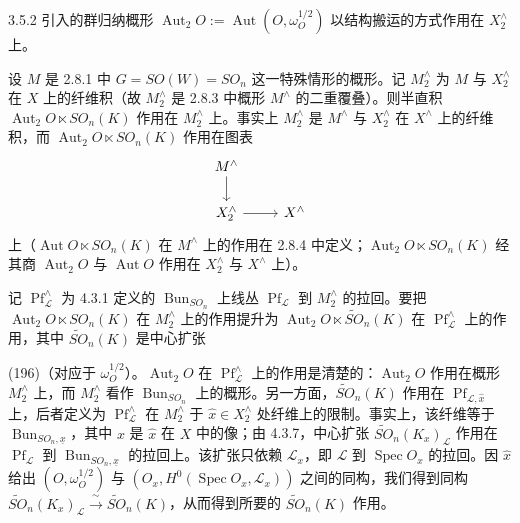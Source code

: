 3.5.2 引入的群归纳概形 $\operatorname{Aut}_{2}O:=\operatorname{Aut}(O,\omega_{O}^{1/2})$ 以结构搬运的方式作用在 $X_{2}^{\wedge}$ 上。

设 $M$ 是 2.8.1 中 $G=SO(W)=SO_{n}$ 这一特殊情形的概形。记 $M_{2}^{\wedge}$ 为 $M$ 与 $X_{2}^{\wedge}$ 在 $X$ 上的纤维积（故 $M_{2}^{\wedge}$ 是 2.8.3 中概形 $M^{\wedge}$ 的二重覆叠）。则半直积 $\operatorname{Aut}_{2}O\ltimes SO_{n}(K)$ 作用在 $M_{2}^{\wedge}$ 上。事实上 $M_{2}^{\wedge}$ 是 $M^{\wedge}$ 与 $X_{2}^{\wedge}$ 在 $X^{\wedge}$ 上的纤维积，而 $\operatorname{Aut}_{2}O\ltimes SO_{n}(K)$ 作用在图表
\[
\begin{tikzcd}
M^{\wedge} \arrow[d]\\
X_{2}^{\wedge} \arrow[r] & X^{\wedge}
\end{tikzcd}
\]
上（$\operatorname{Aut}O\ltimes SO_{n}(K)$ 在 $M^{\wedge}$ 上的作用在 2.8.4 中定义；$\operatorname{Aut}_{2}O\ltimes SO_{n}(K)$ 经其商 $\operatorname{Aut}_{2}O$ 与 $\operatorname{Aut}O$ 作用在 $X_{2}^{\wedge}$ 与 $X^{\wedge}$ 上）。

记 $\operatorname{Pf}_{\mathcal{L}}^{\wedge}$ 为 4.3.1 定义的 $\operatorname{Bun}_{SO_{n}}$ 上线丛 $\operatorname{Pf}_{\mathcal{L}}$ 到 $M_{2}^{\wedge}$ 的拉回。要把 $\operatorname{Aut}_{2}O\ltimes SO_{n}(K)$ 在 $M_{2}^{\wedge}$ 上的作用提升为 $\operatorname{Aut}_{2}O\ltimes\tilde{SO}_{n}(K)$ 在 $\operatorname{Pf}_{\mathcal{L}}^{\wedge}$ 上的作用，其中 $\tilde{SO}_{n}(K)$ 是中心扩张


(196)（对应于 $\omega_{O}^{1/2}$）。$\operatorname{Aut}_{2}O$ 在 $\operatorname{Pf}_{\mathcal{L}}^{\wedge}$ 上的作用是清楚的：$\operatorname{Aut}_{2}O$ 作用在概形 $M_{2}^{\wedge}$ 上，而 $M_{2}^{\wedge}$ 看作 $\operatorname{Bun}_{SO_{n}}$ 上的概形。另一方面，$\tilde{SO}_{n}(K)$ 作用在 $\operatorname{Pf}_{\mathcal{L},\hat x}$ 上，后者定义为 $\operatorname{Pf}_{\mathcal{L}}^{\wedge}$ 在 $M_{2}^{\wedge}$ 于 $\hat x\in X_{2}^{\wedge}$ 处纤维上的限制。事实上，该纤维等于 $\operatorname{Bun}_{SO_{n},\underline{x}}$，其中 $x$ 是 $\hat x$ 在 $X$ 中的像；由 4.3.7，中心扩张 $\tilde{SO}_{n}(K_{x})_{\mathcal{L}}$ 作用在 $\operatorname{Pf}_{\mathcal{L}}$ 到 $\operatorname{Bun}_{SO_{n},\underline{x}}$ 的拉回上。该扩张只依赖 $\mathcal{L}_{x}$，即 $\mathcal{L}$ 到 $\operatorname{Spec}O_{x}$ 的拉回。因 $\hat x$ 给出 $(O,\omega_{O}^{1/2})$ 与 $(O_{x},H^{0}(\operatorname{Spec}O_{x},\mathcal{L}_{x}))$ 之间的同构，我们得到同构 $\tilde{SO}_{n}(K_{x})_{\mathcal{L}}\xrightarrow{\ \sim\ }\tilde{SO}_{n}(K)$，从而得到所要的 $\tilde{SO}_{n}(K)$ 作用。

